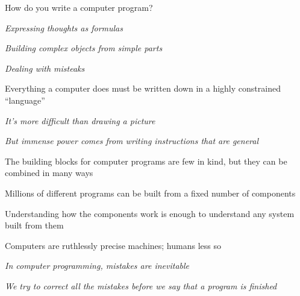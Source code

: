 


How do you write a computer program?

\item {\it Expressing thoughts as formulas}
\item {\it Building complex objects from simple parts}
\item {\it Dealing with misteaks}


Everything a computer does must be written down in a highly
constrained ``language''

\item {\it It's more difficult than drawing a picture}
\item {\it But immense power comes from writing instructions
that are general}


The building blocks for computer programs are few in kind, but
they can be combined in many ways

\item Millions of different programs can be built from a fixed
number of components
\item Understanding how the components work is enough to understand
any system built from them


Computers are ruthlessly precise machines; humans less so

\item {\it In computer programming, mistakes are inevitable}
\item {\it We try to correct all the mistakes before we say
that a program is finished}












\bye
